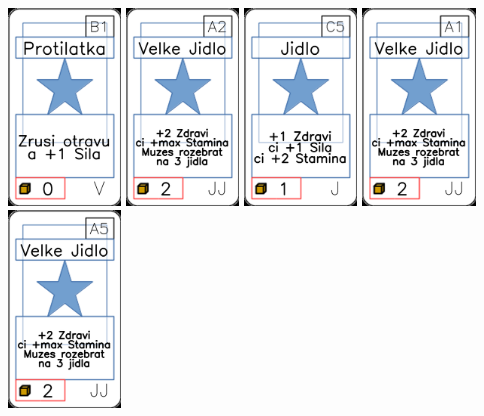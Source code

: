\documentclass[a4paper]{article}
\begin{document}
	\includegraphics[width=3.0cm]{img-1_65}
	\includegraphics[width=3.0cm]{img-1_31}
	\includegraphics[width=3.0cm]{img-1_14}
	\includegraphics[width=3.0cm]{img-1_30}
	\includegraphics[width=3.0cm]{img-1_34}
\end{document}
